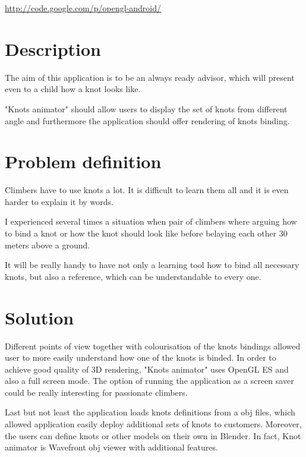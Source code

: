 \label{cha:Opengl-Android application}
\url{http://code.google.com/p/opengl-android/}

\section{Description} %
\label{sec:Description}
The aim of this application is to be an always ready advisor, which will
present even to a child how a knot looks like. 

"Knots animator" should  allow users to display the set of knots from different angle
and furthermore the application should offer rendering of knots binding.


\section*{Problem definition} %
\label{sec:Problem definition}
Climbers have to use knots a lot. It is difficult to learn them all
and it is even harder to explain it by words.

I experienced several times a situation when pair of climbers
where arguing how to bind a knot or how the knot should look like 
before belaying each other 30 meters above a ground.

It will be really handy to have not only a learning tool
how to bind all necessary knots, but also a reference, 
which can be understandable to every one.


\section*{Solution} %
\label{sec:Solution}

Different points of view together with colourisation of the knots bindings
allowed user to more easily understand how one of the knots is binded.
In order to achieve good quality of 3D rendering, "Knots animator" 
uses OpenGL ES and also a full screen mode. 
The option of running the application as a screen saver could be really interesting
for passionate climbers.

Last but not least the application loads knots definitions from a obj files,
which allowed application easily deploy additional sets of knots to customers.
Moreover, the users can define knots or other models on their own in Blender.
In fact, Knot animator is Wavefront obj viewer with additional features.

